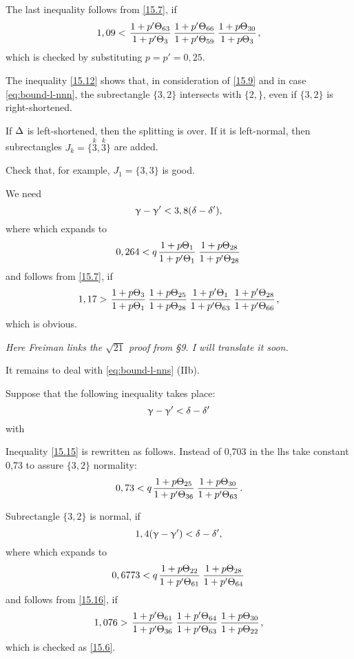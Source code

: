 The last inequality follows from \ref{15.7}, if
\begin{equation*}
	1,09 < \pp{63}{3} \pp{66}{59} \uu{30}{3},
\end{equation*}
which is checked by substituting $p = p' = 0,25$.

The inequality \ref{15.12} shows that, in consideration of \ref{15.9} and in case \ref{eq:bound-l-nnn},
the subrectangle $\{3,2\}$ intersects with $\{2,\}$, even if $\{3,2\}$ is right-shortened.

If $\Delta$ is left-shortened, then the splitting is over.
If it is left-normal, then subrectangles $J_k = \{\overset{k}{3}, \overset{k}{3}\}$ are added.

Check that, for example, $J_1 = \{3, 3\}$ is good.

We need
\begin{equation}\label{15.14}
	\upgamma - \upgamma' < 3,8 (\delta - \delta'),
\end{equation}
where
which expands to
\begin{equation}
	0,264 < q \up{1}{1} \up{28}{28}
\end{equation}
and follows from \ref{15.7}, if
\begin{equation*}
	1,17 > \uu{3}{1} \uu{25}{28} \pp{1}{63} \pp{28}{66},
\end{equation*}
which is obvious.

\textit{
	Here Freiman links the $\sqrt{21}$ proof from \S9.
	I will translate it soon.
}

It remains to deal with \ref{eq:bound-l-nns} (IIb).

Suppose that the following inequality takes place:
\begin{equation}\label{15.15}
	\upgamma - \upgamma' < \delta - \delta'
\end{equation}
with

Inequality \ref{15.15} is rewritten as follows.
Instead of 0,703 in the lhs take constant 0,73 to assure $\{3, 2\}$ normality:
\begin{equation}\label{15.16}
	0,73 < q \up{25}{36} \up{30}{63}.
\end{equation}

Subrectangle $\{3, 2\}$ is normal, if
\begin{equation*}\label{15.17}
	1,4 (\upgamma - \upgamma') < \delta - \delta',
\end{equation*}
where
which expands to
\begin{equation*}
	0,6773 < q \up{22}{61} \up{28}{64}
\end{equation*}
and follows from \ref{15.16}, if
\begin{equation*}
	1,076 > \pp{61}{36} \pp{64}{63} \uu{30}{22},
\end{equation*}
which is checked as \ref{15.6}.

